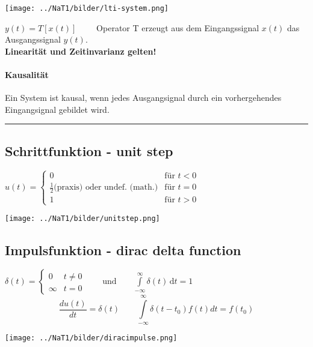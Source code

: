 \begin{center}
	\texttt{[image: ../NaT1/bilder/lti-system.png]}
\end{center}

$ y(t) = T [ x(t)] \qquad $ Operator T erzeugt aus dem Eingangssignal $ x(t) $ das Ausgangssignal $ y(t)$. \\
\textbf{Linearität und Zeitinvarianz gelten!}

\paragraph{Kausalität} Ein System ist kausal, wenn jedes Ausgangsignal durch ein vorhergehendes Eingangsignal gebildet wird.
\\
\hrule
\subsection{Schrittfunktion - unit step}
\begin{minipage}{10cm}
	$u(t) =	\begin{cases}
	  		 0 & \text{für } t < 0 \\
	  		 \frac{1}{2} \text{(praxis)}  \text{ oder undef. (math.)} & \text{für } t = 0 \\
	  		 1 & \text{für } t > 0
	  	\end{cases}
	$
\end{minipage}
\begin{minipage}{8cm}
	\texttt{[image: ../NaT1/bilder/unitstep.png]}
\end{minipage}


\subsection{Impulsfunktion - dirac delta function}
	\begin{minipage}{10cm}
		$\delta (t)=\begin{cases} 0 & t\ne 0\\\infty & t=0\end{cases} \qquad
		\text{und} \qquad \int\limits_{-\infty}^\infty \delta(t) \, \mathrm dt = 1 $\\
		$$\frac{du(t)}{dt}=\delta(t) \qquad
		\int\limits_{-\infty}^{\infty}\delta(t-t_0)f(t)dt=f(t_0)$$
	\end{minipage}
	\begin{minipage}{8cm}
		\texttt{[image: ../NaT1/bilder/diracimpulse.png]}
	\end{minipage}

